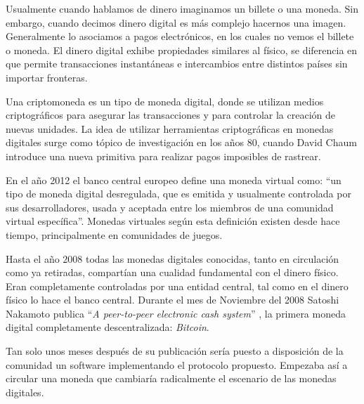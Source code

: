 \begin{intro}
Usualmente cuando hablamos de dinero imaginamos un billete o una moneda. Sin
  embargo, cuando decimos dinero digital es m\'as complejo hacernos una imagen.
  Generalmente lo asociamos a pagos electr\'onicos, en los cuales no vemos el
  billete o moneda. El dinero digital exhibe propiedades similares al f\'isico,
  se diferencia en que permite transacciones instant\'aneas e intercambios
  entre distintos pa\'ises sin importar fronteras.

Una criptomoneda es un tipo de moneda digital, donde se utilizan medios
  criptogr\'aficos para asegurar las transacciones y para controlar la
  creaci\'on de nuevas unidades. La idea de utilizar herramientas
  criptogr\'aficas en monedas digitales surge como t\'opico de
  investigaci\'on en los a\~nos 80, cuando David Chaum \cite{chaum1983blind}
  introduce una nueva primitiva para realizar pagos imposibles de rastrear.

En el a\~no 2012 el banco central europeo \cite{bcentraleuro} define una moneda
  virtual como: \enquote{un tipo de moneda digital desregulada, que es emitida y
  usualmente controlada por sus desarrolladores, usada y aceptada entre los
  miembros de una comunidad virtual espec\'ifica}. Monedas virtuales
  seg\'un esta definici\'on existen desde hace tiempo, principalmente en
  comunidades de juegos.

Hasta el a\~no 2008 todas las monedas digitales conocidas, tanto en
  circulaci\'on como ya retiradas, compart\'ian una cualidad fundamental con
  el dinero f\'isico. Eran completamente controladas por una entidad central,
  tal como en el dinero f\'isico lo hace el banco central. Durante el mes de
  Noviembre del 2008 Satoshi Nakamoto publica ``\textit{A peer-to-peer
  electronic cash system}'' \cite{nakamoto2008bitcoin}, la primera moneda
  digital completamente descentralizada\cite{brito2013bitcoin}:
  \textit{Bitcoin}.

Tan solo unos meses despu\'es de su publicaci\'on ser\'ia puesto a
  disposici\'on de la comunidad un software implementando el protocolo
  propuesto. Empezaba as\'i a circular una moneda que cambiar\'ia radicalmente
  el escenario de las monedas digitales.


\end{intro}
